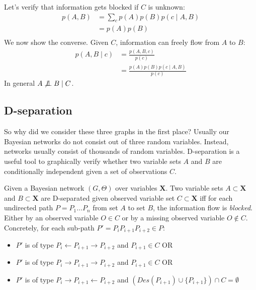 \noindent
Let's verify that information gets blocked if $C$ is unknown:
\begin{equation}\begin{split}
p(A, B) 
	&= \sum_c p(A)p(B)p(c \mid A, B)\\
	&= p(A) p(B) \\
\end{split}\end{equation}
We now show the converse. Given $C$, information can freely flow
from $A$ to $B$:
\begin{equation}\begin{split}
p(A, B \mid c) 
	&= \frac{p(A, B, c)}{p(c)} \\
	&= \frac{p(A)p(B)p(c \mid A, B)}{p(c)}
\end{split}\end{equation}
In general $A \not \CI B \mid C$.

\subsection{D-separation}
So why did we consider these three graphs in the first place?
Usually our Bayesian networks do not consist out of three random
variables. Instead, networks usually consist of thousands of
random variables. D-separation is a useful tool to graphically
verify whether two variable sets $A$ and $B$ are conditionally 
independent given a set of observations $C$.

\begin{defn}[D-separation]
Given a Bayesian network $(G, \Theta)$ over variables $\textbf{X}$.
Two variable sets $A \subset \textbf{X}$ and $B \subset \textbf{X}$ 
are D-separated given observed variable set $C \subset \textbf{X}$ 
iff for each undirected path $P = P_1\dots P_n$ 
from set $A$ to set $B$, the information flow is 
\textit{blocked}. Either by an observed variable $O \in C$ or
by a missing observed variable $O \notin C$. Concretely, for 
each sub-path $P' = P_iP_{i+1}P_{i+2} \in P$:

\begin{itemize}
\item $P'$ is of type $P_i \leftarrow P_{i+1} \rightarrow P_{i+2}$ 
	and $P_{i+1} \in C$ OR
\item $P'$ is of type $P_i \rightarrow P_{i+1}\rightarrow P_{i+2}$ 
	and $P_{i+1} \in C$ OR
\item $P'$ is of type $P_i \rightarrow P_{i+1}\leftarrow P_{i+2}$
	and $(Des(P_{i+1}) \cup \{P_{i+1}\}) \cap C = \emptyset$
\end{itemize}
\end{defn}


